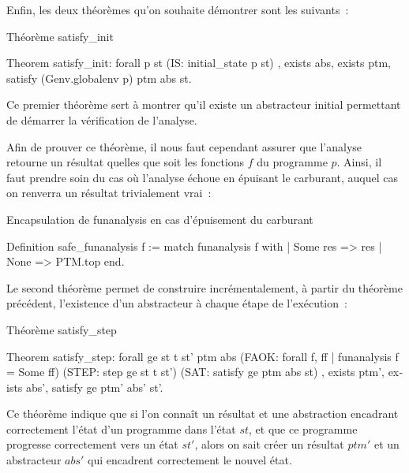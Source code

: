 \documentclass{article}
\begin{document}
Enfin, les deux théorèmes qu'on souhaite démontrer sont les suivants~:

\begin{coqcode}
\caption{Théorème satisfy\_init}
\begin{english}
\begin{coq}
Theorem satisfy_init:
forall p st
  (IS:   initial_state p st)
  ,
  exists abs, exists ptm, satisfy (Genv.globalenv p) ptm abs st.
\end{coq}
\end{english}
\end{coqcode}

Ce premier théorème sert à montrer qu'il existe un abstracteur initial
permettant de démarrer la vérification de l'analyse.

Afin de prouver ce théorème, il nous faut cependant assurer que l'analyse
retourne un résultat quelles que soit les fonctions $f$ du programme
$p$. Ainsi, il faut prendre soin du cas où l'analyse échoue en
épuisant le carburant, auquel cas on renverra un résultat trivialement vrai~:

\begin{coqcode}
\caption{Encapsulation de funanalysis en cas d'épuisement du carburant}
\begin{english}
\begin{coq}
Definition safe_funanalysis f :=
match funanalysis f with
| Some res => res
| None     => PTM.top
end.
\end{coq}
\end{english}
\end{coqcode}

Le second théorème permet de construire incrémentalement, à partir du théorème
précédent, l'existence d'un abstracteur à chaque étape de l'exécution~:

\begin{coqcode}
\caption{Théorème satisfy\_step}
\begin{english}
\begin{coq}
Theorem satisfy_step:
forall ge st t st' ptm abs
  (FAOK: forall f, {ff | funanalysis f = Some ff})
  (STEP: step ge st t st')
  (SAT:  satisfy ge ptm abs st)
  ,
  exists ptm', exists abs', satisfy ge ptm' abs' st'.
\end{coq}
\end{english}
\end{coqcode}

Ce théorème indique que si l'on connaît un résultat et une abstraction
encadrant correctement l'état d'un programme dans l'état $st$, et que
ce programme progresse correctement vers un état $st'$, alors on sait
créer un résultat $ptm'$ et un abstracteur $abs'$ qui
encadrent correctement le nouvel état.
\end{document}
